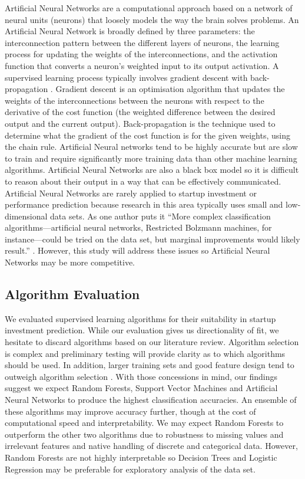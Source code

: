 \documentclass[../thesis/thesis.tex]{subfiles}
\begin{document}
Artificial Neural Networks are a computational approach based on a network of neural units (neurons) that loosely models the way the brain solves problems. An Artificial Neural Network is broadly defined by three parameters: the interconnection pattern between the different layers of neurons, the learning process for updating the weights of the interconnections, and the activation function that converts a neuron's weighted input to its output activation. A supervised learning process typically involves gradient descent with back-propagation \cite{rumelhart1988}. Gradient descent is an optimisation algorithm that updates the weights of the interconnections between the neurons with respect to the derivative of the cost function (the weighted difference between the desired output and the current output). Back-propagation is the technique used to determine what the gradient of the cost function is for the given weights, using the chain rule. Artificial Neural networks tend to be highly accurate but are slow to train and require significantly more training data than other machine learning algorithms. Artificial Neural Networks are also a black box model so it is difficult to reason about their output in a way that can be effectively communicated. Artificial Neural Networks are rarely applied to startup investment or performance prediction because research in this area typically uses small and low-dimensional data sets. As one author puts it ``More complex classification algorithms—artificial neural networks, Restricted Bolzmann machines, for instance—could be tried on the data set, but marginal improvements would likely result.'' \cite{beckwith2016}. However, this study will address these issues so Artificial Neural Networks may be more competitive.

\subsection{Algorithm Evaluation}

We evaluated supervised learning algorithms for their suitability in startup investment prediction. While our evaluation gives us directionality of fit, we hesitate to discard algorithms based on our literature review. Algorithm selection is complex and preliminary testing will provide clarity as to which algorithms should be used. In addition, larger training sets and good feature design tend to outweigh algorithm selection \cite{caruana2008}. With those concessions in mind, our findings suggest we expect Random Forests, Support Vector Machines and Artificial Neural Networks to produce the highest classification accuracies. An ensemble of these algorithms may improve accuracy further, though at the cost of computational speed and interpretability. We may expect Random Forests to outperform the other two algorithms due to robustness to missing values and irrelevant features and native handling of discrete and categorical data. However, Random Forests are not highly interpretable so Decision Trees and Logistic Regression may be preferable for exploratory analysis of the data set.
\end{document}
